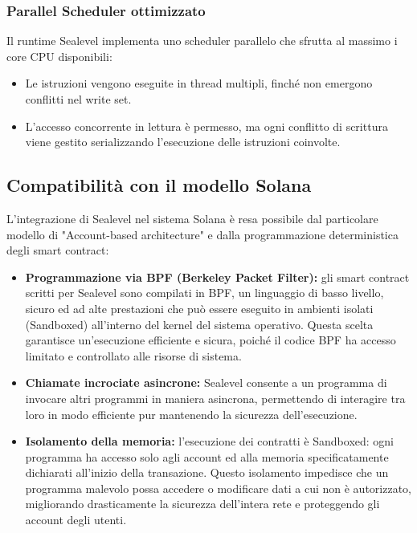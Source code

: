\documentclass[a4paper,12pt]{report}
\begin{document}
	\subsubsection{Parallel Scheduler ottimizzato}
	Il runtime Sealevel implementa uno scheduler parallelo che sfrutta al massimo i core CPU disponibili:
	\begin{itemize}
		\item Le istruzioni vengono eseguite in thread multipli, finché non emergono conflitti nel write set.
		\item L’accesso concorrente in lettura è permesso, ma ogni conflitto di scrittura viene gestito serializzando l’esecuzione delle istruzioni coinvolte.
	\end{itemize}
	
	\subsection{Compatibilità con il modello Solana}
	L’integrazione di Sealevel nel sistema Solana è resa possibile dal particolare modello di "Account-based architecture" e dalla programmazione deterministica degli smart contract:
	\begin{itemize}
		\item \textbf{Programmazione via BPF (Berkeley Packet Filter):} gli smart contract scritti per Sealevel sono compilati in BPF, un linguaggio di basso livello, sicuro ed ad alte prestazioni che può essere eseguito in ambienti isolati (Sandboxed) all'interno del kernel del sistema operativo. Questa scelta garantisce un'esecuzione efficiente e sicura, poiché il codice BPF ha accesso limitato e controllato alle risorse di sistema.
		\item \textbf{Chiamate incrociate asincrone:} Sealevel consente a un programma di invocare altri programmi in maniera asincrona, permettendo di interagire tra loro in modo efficiente pur mantenendo la sicurezza dell'esecuzione.
		\item \textbf{Isolamento della memoria:} l’esecuzione dei contratti è Sandboxed: ogni programma ha accesso solo agli account ed alla memoria specificatamente dichiarati all'inizio della transazione. Questo isolamento impedisce che un programma malevolo possa accedere o modificare dati a cui non è autorizzato, migliorando drasticamente la sicurezza dell'intera rete e proteggendo gli account degli utenti.
	\end{itemize}
	
\end{document}
